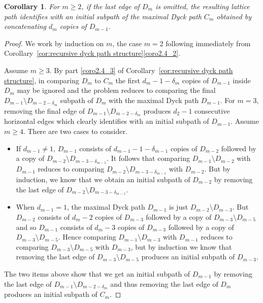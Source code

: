 \documentclass[10pt]{amsart}
\newtheorem{corollary}[theorem]{Corollary}
\theoremstyle{definition}
\begin{document}
\begin{corollary}
 \label{cor:initial subpath}
 For $m\ge2$, if the last edge of $D_m$ is omitted, the resulting lattice path identifies with an initial subpath of the maximal Dyck path $C_m$ obtained by concatenating $d_m$ copies of $D_{m-1}$.
\end{corollary}
\begin{proof}
 We work by induction on $m$, the case $m=2$ following immediately from Corollary~\ref{cor:recursive dyck path structure}\ref{coro2.4_2}. 

 Assume $m\ge3$.
 By part \ref{coro2.4_3} of Corollary~\ref{cor:recursive dyck path structure}, in comparing $D_m$ to $C_m$ the first $d_m-1-\delta_m$ copies of $D_{m-1}$ inside $D_m$ may be ignored and the problem reduces to comparing the final $D_{m-1}\setminus D_{m-2-\delta_m}$ subpath of $D_m$ with the maximal Dyck path $D_{m-1}$.
 For $m=3$, removing the final edge of $D_{m-1}\setminus D_{m-2-\delta_m}$ produces $d_2-1$ consecutive horizontal edges which clearly identifies with an initial subpath of $D_{m-1}$.
 Assume $m\ge4$.
 There are two cases to consider.
 \begin{itemize}
 \item If $d_{m-1}\ne1$, $D_{m-1}$ consists of $d_{m-1}-1-\delta_{m-1}$ copies of $D_{m-2}$ followed by a copy of $D_{m-2}\setminus D_{m-3-\delta_{m-1}}$. 
 It follows that comparing $D_{m-1}\setminus D_{m-2}$ with $D_{m-1}$ reduces to comparing $D_{m-2}\setminus D_{m-3-\delta_{m-1}}$ with $D_{m-2}$.
 But by induction, we know that we obtain an initial subpath of $D_{m-2}$ by removing the last edge of $D_{m-2}\setminus D_{m-3-\delta_{m-1}}$.
 \item When $d_{m-1}=1$, the maximal Dyck path $D_{m-1}$ is just $D_{m-2}\setminus D_{m-3}$. 
 But $D_{m-2}$ consists of $d_m-2$ copies of $D_{m-3}$ followed by a copy of $D_{m-3}\setminus D_{m-5}$ and so $D_{m-1}$ consists of $d_m-3$ copies of $D_{m-3}$ followed by a copy of $D_{m-3}\setminus D_{m-5}$. 
 Hence comparing $D_{m-1}\setminus D_{m-3}$ with $D_{m-1}$ reduces to comparing $D_{m-3}\setminus D_{m-5}$ with $D_{m-3}$, but by induction we know that removing the last edge of $D_{m-3}\setminus D_{m-5}$ produces an initial subpath of $D_{m-3}$.
 \end{itemize}
 The two items above show that we get an initial subpath of $D_{m-1}$ by removing the last edge of $D_{m-1}\setminus D_{m-2-\delta_m}$ and thus removing the last edge of $D_m$ produces an initial subpath of $C_m$. 
\end{proof}
\end{document}
